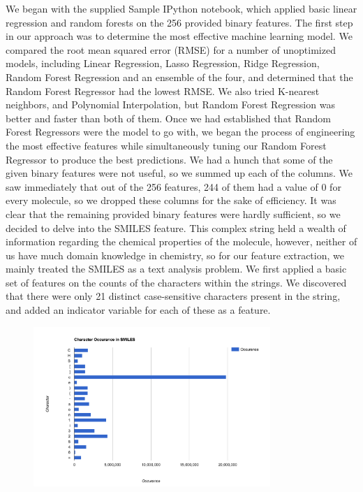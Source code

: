 \documentclass[]{article}
\begin{document}
\begin{flushleft}
	We began with the supplied Sample IPython notebook, which applied basic linear regression and random forests on the 256 provided binary features. The first step in our approach was to determine the most effective machine learning model. We compared the root mean squared error (RMSE) for a number of unoptimized models, including Linear Regression, Lasso Regression, Ridge Regression, Random Forest Regression and an ensemble of the four, and determined that the Random Forest Regressor had the lowest RMSE. We also tried K-nearest neighbors, and Polynomial Interpolation, but Random Forest Regression was better and faster than both of them.
	\newline\newline
	Once we had established that Random Forest Regressors were the model to go with, we began the process of engineering the most effective features while simultaneously tuning our Random Forest Regressor to produce the best predictions.  We had a hunch that some of the given binary features were not useful, so we summed up each of the columns. We saw immediately that out of the 256 features, 244 of them had a value of 0 for every molecule, so we dropped these columns for the sake of efficiency.
	\newline\newline
	It was clear that the remaining provided binary features were hardly sufficient, so we decided to delve into the SMILES feature. This complex string held a wealth of information regarding the chemical properties of the molecule, however, neither of us have much domain knowledge in chemistry, so for our feature extraction, we mainly treated the SMILES as a text analysis problem.
	\newline\newline
	We first applied a basic set of features on the counts of the characters within the strings. We discovered that there were only 21 distinct case-sensitive characters present in the string, and added an indicator variable for each of these as a feature. 
	\newline\newline
	\begin{figure}[h]
		\centering
		\includegraphics[width=0.8\textwidth]{CharacterOccurance}

\end{figure}
\end{flushleft}
\end{document}
